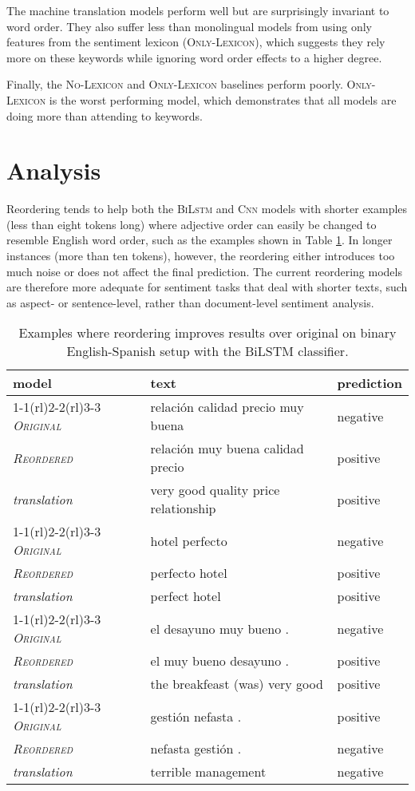 \documentclass[11pt,a4paper]{article}
\newcommand{\original}{\textsc{Original}\xspace}
\newcommand{\mtreordered}{\textsc{Reordered}\xspace}
\newcommand{\onlylex}{\textsc{Only-Lexicon}\xspace}
\newcommand{\nolex}{\textsc{No-Lexicon}\xspace}
\newcommand{\bilstm}{\textsc{BiLstm}\xspace}
\newcommand{\cnn}{\textsc{Cnn}\xspace}
\begin{document}
The machine translation models perform well but are surprisingly invariant to word order. They also suffer less than monolingual models from using only features from the sentiment lexicon (\onlylex), which suggests they rely more on these keywords while ignoring word order effects to a higher degree.

Finally, the \nolex and \onlylex baselines perform poorly. \onlylex is the worst performing model, which demonstrates that all models are doing more than attending to keywords.



\section{Analysis}

Reordering tends to help both the \bilstm and \cnn models with shorter examples (less than eight tokens long) where adjective order can easily be changed to resemble English word order, such as the examples shown in Table \ref{helpful_examples}. In longer instances (more than ten tokens), however, the reordering either introduces too much noise or does not affect the final prediction. The current reordering models are therefore more adequate for sentiment tasks that deal with shorter texts, such as aspect- or sentence-level, rather than document-level sentiment analysis.

\begin{table}[]
\centering\scriptsize
\newcommand{\sepp}{\cmidrule(rl){1-1}\cmidrule(rl){2-2}\cmidrule(rl){3-3}}
\begin{tabular}{lll}
\toprule
model & text & prediction \\
\sepp
\emph{\original} & relación calidad precio muy buena & negative \\
\emph{\mtreordered} & relación muy buena calidad precio & positive \\
\textit{translation} & very good quality price relationship & positive \\
\sepp
\emph{\original} & hotel perfecto & negative \\
\emph{\mtreordered} & perfecto hotel & positive \\
\textit{translation} & perfect hotel & positive \\
\sepp
\emph{\original} & el desayuno muy bueno . & negative \\
\emph{\mtreordered} & el muy bueno desayuno . & positive \\
\textit{translation} & the breakfeast (was) very good & positive \\
\sepp
\emph{\original} & gestión nefasta . & positive \\
\emph{\mtreordered} & nefasta gestión . & negative \\
\textit{translation} & terrible management & negative \\
\bottomrule
\end{tabular}
\caption{Examples where reordering improves results over original on binary English-Spanish setup with the BiLSTM classifier.}
\label{helpful_examples}

\end{table}
\end{document}
